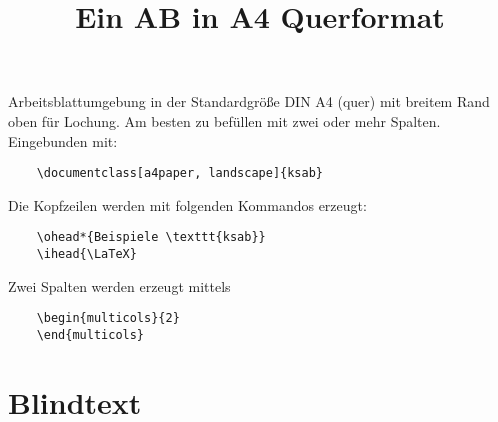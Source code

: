 \documentclass[a4paper, landscape]{ksab}
\title{Ein AB in A4 Querformat}
\begin{document}
  \begin{multicols}{2}

  \maketitle
  
  Arbeitsblattumgebung in der Standardgröße DIN A4 (quer) mit breitem Rand oben für Lochung. Am besten zu befüllen mit zwei oder mehr Spalten.\\
  Eingebunden mit:
  \begin{verbatim}
    \documentclass[a4paper, landscape]{ksab}
  \end{verbatim}
  
  Die Kopfzeilen werden mit folgenden Kommandos erzeugt:
  \begin{verbatim}
    \ohead*{Beispiele \texttt{ksab}}
    \ihead{\LaTeX}
  \end{verbatim}
  
  Zwei Spalten werden erzeugt mittels
  \begin{verbatim}
    \begin{multicols}{2}
    \end{multicols}
  \end{verbatim}
  
  
  \section{Blindtext}

    \blindtext[4]
  \end{multicols}
\end{document}
